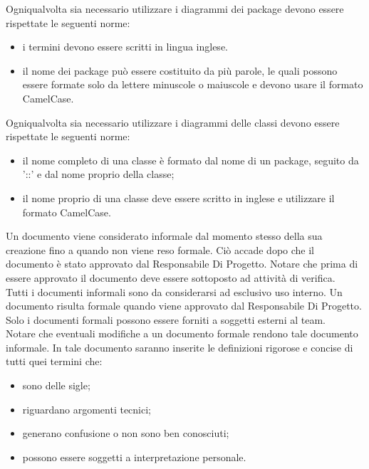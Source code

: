 					Ogniqualvolta sia necessario utilizzare i diagrammi dei package devono essere rispettate le seguenti norme:
					\begin{itemize}
					\item i termini devono essere scritti in lingua inglese.
					\item il nome dei package può essere costituito da più parole, le quali possono essere formate solo da lettere minuscole o maiuscole e devono usare il formato CamelCase.
					\end{itemize}
					Ogniqualvolta sia necessario utilizzare i diagrammi delle classi devono essere rispettate le seguenti norme:
					\begin{itemize}
					\item il nome completo di una classe è formato dal nome di un package, seguito da '::' e dal nome proprio della classe;
					\item il nome proprio di una classe deve essere scritto in inglese e utilizzare il formato CamelCase.
					\end{itemize}		
					Un documento viene considerato informale dal momento stesso della sua creazione fino a quando non viene reso formale. Ciò accade dopo che il documento è stato approvato dal Responsabile Di Progetto. Notare che prima di essere approvato il documento deve essere sottoposto ad attività di verifica.\\
					Tutti i documenti informali sono da considerarsi ad esclusivo uso interno.
					Un documento risulta formale quando viene approvato dal Responsabile Di Progetto. Solo i documenti formali possono essere forniti a soggetti esterni al team.\\
					Notare che eventuali modifiche a un documento formale rendono tale documento informale.
					In tale documento saranno inserite le definizioni rigorose e concise di tutti quei termini che:
					\begin{itemize}
						\item sono delle sigle;
						\item riguardano argomenti tecnici;
						\item generano confusione o non sono ben conosciuti;
						\item possono essere soggetti a interpretazione personale.
					\end{itemize}
